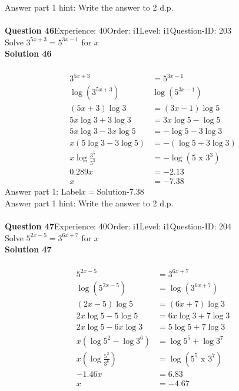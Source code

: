 \documentclass{article}
\begin{document}
Answer part 1 hint: \hspace{15pt}Write the answer to 2 d.p.\\
\\[4pt]
\noindent\textbf{Question 46}\hspace{20pt}Experience: 40\hspace{20pt}Order: i1\hspace{20pt}Level: i1\hspace{20pt}Question-ID: 203\\[2pt]
Solve $3^{5x+3}=5^{3x-1}$ for $x$\\[4pt]
\noindent\textbf{Solution 46}\\[2pt]
\\[-35pt]\begin{align*}
3^{5x+3}&=5^{3x-1}\\[2pt]
\log(3^{5x+3})&\log(5^{3x-1})\\[2pt]
(5x+3)\log3&=(3x-1)\log5\\[2pt]
5x\log3+3\log3&=3x\log5-\log5\\[2pt]
5x\log3-3x\log5&=-\log5-3\log3\\[2pt]
x(5\log3-3\log5)&=-(\log5+3\log3)\\[2pt]
x\log\displaystyle\frac{3^5}{5^3}&=-\log(5 \,\, \text{x} \,\, 3^3)\\[2pt]
0.289x&=-2.13\\[2pt]
x&=-7.38
\end{align*}
Answer part 1: \hspace{10pt}Label\hspace{10pt}$x=$\hspace{10pt}Solution\hspace{10pt}-7.38\\
Answer part 1 hint: \hspace{15pt}Write the answer to 2 d.p.\\
\\[4pt]
\noindent\textbf{Question 47}\hspace{20pt}Experience: 40\hspace{20pt}Order: i1\hspace{20pt}Level: i1\hspace{20pt}Question-ID: 204\\[2pt]
Solve $5^{2x-5}=3^{6x+7}$ for $x$\\[4pt]
\noindent\textbf{Solution 47}\\[2pt]
\\[-35pt]\begin{align*}
5^{2x-5}&=3^{6x+7}\\[2pt]
\log(5^{2x-5})&=\log(3^{6x+7})\\[2pt]
(2x-5)\log5&=(6x+7)\log3\\[2pt]
2x\log5-5\log5&=6x\log3+7\log3\\[2pt]
2x\log5-6x\log3&=5\log5+7\log3\\[2pt]
x(\log5^2-\log3^6)&=\log5^5+\log3^7\\[2pt]
x\left(\log\displaystyle\frac{5^2}{3^6}\right)&=\log(5^5\,\,\text{x}\,\,3^7)\\[2pt]
-1.46x&=6.83\\[2pt]
x&=-4.67
\end{align*}
\end{document}

